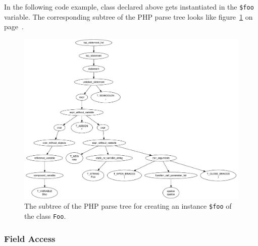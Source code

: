 In the following code example, class declared above gets instantiated in the \texttt{\$foo} variable. The corresponding subtree of the PHP parse tree looks like figure~\ref{fig:parse-tree-new-foo} on page~\pageref{fig:parse-tree-new-foo}.


\begin{figure}[htb]
  \begin{center}
    \includegraphics[scale=0.5]{images/parsetree-new-foo}
   \caption{The subtree of the PHP parse tree for creating an instance \texttt{\$foo} of the class \texttt{Foo}.}
   \label{fig:parse-tree-new-foo}
  \end{center}
\end{figure}


\subsubsection{Field Access}

